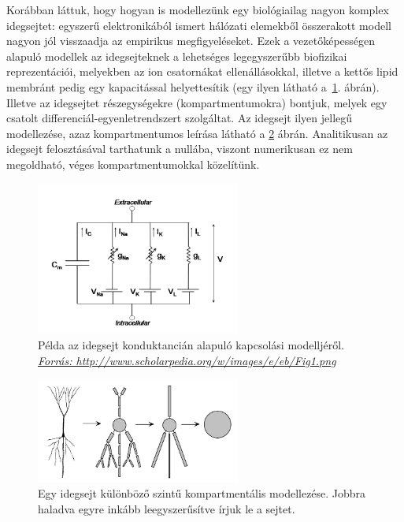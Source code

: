 Korábban láttuk, hogy hogyan is modellezünk egy biológiailag nagyon komplex idegsejtet: egyszerű elektronikából ismert hálózati elemekből összerakott modell nagyon jól visszaadja az empirikus megfigyeléseket. Ezek a vezetőképességen alapuló modellek az idegsejteknek a lehetséges legegyszerűbb biofizikai reprezentációi, melyekben az ion csatornákat ellenállásokkal, illetve a kettős lipid membránt pedig egy kapacitással helyettesítik (egy ilyen látható a~\ref{fig:fig1}. ábrán). Illetve az idegsejtet részegységekre (kompartmentumokra) bontjuk, melyek egy csatolt differenciál-egyenletrendszert szolgáltat. Az idegsejt ilyen jellegű modellezése, azaz kompartmentumos leírása látható a \ref{fig:multi_comp} ábrán. Analitikusan az idegsejt felosztásával tarthatunk a nullába, viszont numerikusan ez nem megoldható, véges kompartmentumokkal közelítünk.

\begin{figure}[h!]
	\centering
	\includegraphics[width=0.6\textwidth]{./fig/Fig1.png}
	\caption[Idegsejt modell]{Példa az idegsejt konduktancián alapuló kapcsolási modelljéről. \\ \href{http://www.scholarpedia.org/w/images/e/eb/Fig1.png}{\textit{Forrás: http://www.scholarpedia.org/w/images/e/eb/Fig1.png}}}
	\label{fig:fig1}
\end{figure}

\begin{figure}[!h]
	\centering
	\includegraphics[width=0.6\textwidth]{./fig/multi-compartment.png}
	\caption[Többkompartmentumos modellezés]{\cite{dayan2001theoretical} Egy idegsejt különböző szintű kompartmentális modellezése. Jobbra haladva egyre inkább leegyszerűsítve írjuk le a sejtet.}
	\label{fig:multi_comp}
\end{figure}


